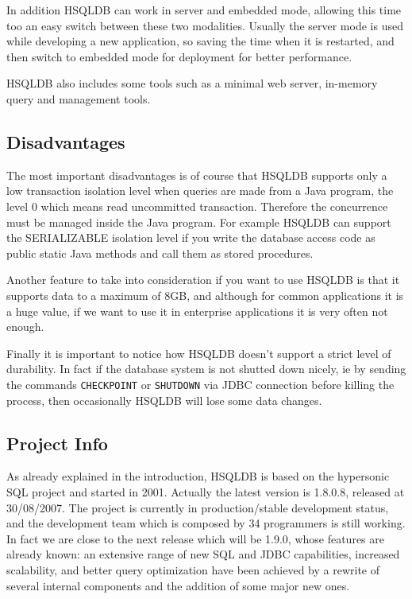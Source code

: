 In addition HSQLDB can work in server and embedded mode, allowing this time too an easy switch between these two modalities. Usually the server mode is used while developing a new application, so saving the time when it is restarted, and then switch to embedded mode for deployment for better performance.

HSQLDB also includes some tools such as a minimal web server, in-memory query and management tools.
			
			\subsection{Disadvantages}
The most important disadvantages is of course that HSQLDB supports only a low transaction isolation level when queries are made from a Java program, the level 0 which means read uncommitted transaction. Therefore the concurrence must be managed inside the Java program. For example HSQLDB can support the SERIALIZABLE isolation level if you write the database access code as public static Java methods and call them as stored procedures.

Another feature to take into consideration if you want to use HSQLDB is that it supports data to a maximum of 8GB, and although for common applications it is a huge value, if we want to use it in enterprise applications it is very often not enough.

Finally it is important to notice how HSQLDB doesn't support a strict level of durability. In fact if the database system is not shutted down nicely, ie by sending the commands \lstinline!CHECKPOINT! or \lstinline!SHUTDOWN! via JDBC connection before killing the process, then occasionally HSQLDB will lose some data changes.

			\subsection{Project Info}
As already explained in the introduction, HSQLDB is based on the hypersonic SQL project and started in 2001. Actually the latest version is 1.8.0.8, released at 30/08/2007. The project is currently in production/stable development status, and the development team which is composed by 34 programmers is still working. In fact we are close to the next release which will be 1.9.0, whose features are already known: an extensive range of new SQL and JDBC capabilities, increased scalability, and better query optimization have been achieved by a rewrite of several internal components and the addition of some major new ones. 
			
